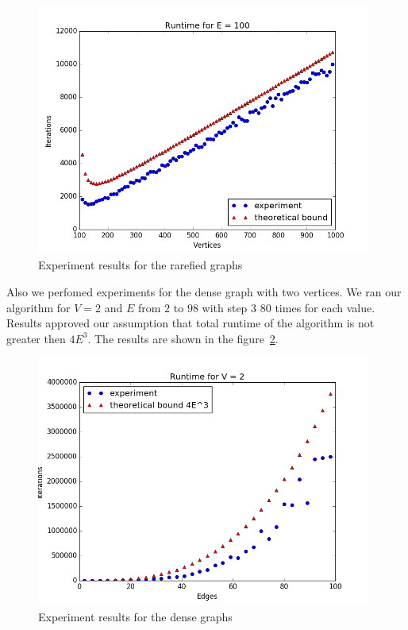 \documentclass[a4paper,10pt]{article}
\theoremstyle{definition}
\begin{document}
\begin{figure}[ht]
\label{exper_rar} 
 \begin{center}
  \includegraphics[width = 11cm]{pic/exper_rar.png}
  \caption{Experiment results for the rarefied graphs}
 \end{center} 
\end{figure}

Also we perfomed experiments for the dense graph with two vertices. We ran our algorithm for $V = 2$ and $E$ from $2$ to $98$ with step $3$ $80$ times for each value. Results approved our assumption that total runtime of the algorithm is not greater then $4E^3$. The results are shown in the figure~\ref{exper_den}.

\begin{figure}[ht]
\label{exper_den} 
 \begin{center}
  \includegraphics[width = 11cm]{pic/exper_den.png}
  \caption{Experiment results for the dense graphs}
 \end{center} 
\end{figure}
\end{document}
